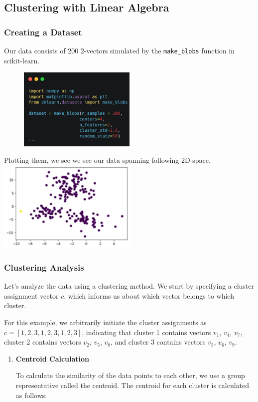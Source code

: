 \documentclass[12pt, a4paper]{article}
\begin{document}
\begin{flushleft}
        \subsection{Clustering with Linear Algebra}
        \begin{flushleft}
        \subsubsection{Creating a Dataset}
        \begin{flushleft}
        Our data consists of 200 2-vectors simulated by the \texttt{make\_blobs} function in scikit-learn.

        \begin{figure}[h]
        \centering
        \includegraphics[width=0.5\textwidth]{data_create.png}
        \end{figure}
        Plotting them, we see we see our data spanning following 2D-space.
        \includegraphics[width=0.5\textwidth,center]{data_rep.png}
        \end{flushleft}
        \subsubsection{Clustering Analysis}
        \begin{flushleft}
        Let's analyze the data using a clustering method. We start by specifying a cluster assignment vector $c$, which informs us about which vector belongs to which cluster. 

        For this example, we arbitrarily initiate the cluster assignments as $c = [1,2,3,1,2,3,1,2,3]$, indicating that cluster 1 contains vectors $v_1$, $v_4$, $v_7$, cluster 2 contains vectors $v_2$, $v_5$, $v_8$, and cluster 3 contains vectors $v_3$, $v_6$, $v_9$.
        \end{flushleft}
        \begin{enumerate}
        \item\textbf{Centroid Calculation}
        \begin{flushleft}
        To calculate the similarity of the data points to each other, we use a group representative called the centroid. The centroid for each cluster is calculated as follows:


\end{flushleft}
\end{enumerate}
\end{flushleft}
\end{flushleft}
\end{document}
